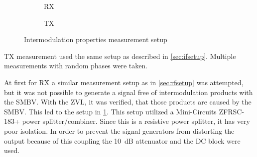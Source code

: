 \documentclass[12pt,a4paper,parskip=full,abstracton]{scrartcl}
\begin{document}
\begin{figure}[htb]
\begin{subfigure}[t]{.5\linewidth}
{        }
        \caption{RX}
    \end{subfigure}
    \begin{subfigure}[t]{.5\linewidth}
        \centering
        \caption{TX}
    \end{subfigure}
    \caption{Intermodulation properties measurement setup}
    \label{fig:imsetup}
\end{figure}
TX measurement used the same setup as described in \cref{sec:ifsetup}. Multiple
measurements with random phases were taken.

At first for RX a similar measurement setup as in \cref{sec:rfsetup} was attempted,
but it was not possible to generate a signal free of intermodulation products with
the SMBV. With the ZVL, it was verified, that those products are caused by the
SMBV. This led to the setup in \cref{fig:imsetup}. This setup utilized a Mini-Circuits
ZFRSC-183+ power splitter/combiner. Since this is a resistive power splitter, it has
very poor isolation\cite{pwrsplit}. In order to prevent the signal generators from
distorting the output because of this coupling the \SI{10}{\deci\bel} attenuator
and the DC block were used.
\end{document}
